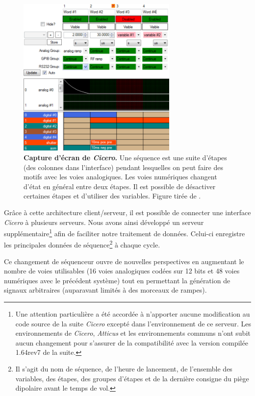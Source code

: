 \begin{figure}
\centering
\includegraphics[width=0.7\textwidth]{Fig/Modif_exp/cicero.png}
\caption{\textbf{Capture d'écran de \emph{Cicero}.} Une séquence est une suite d'étapes (des colonnes dans l'interface) pendant lesquelles on peut faire des motifs avec les voies analogiques. Les voies numériques changent d'état en général entre deux étapes. Il est possible de désactiver certaines étapes et d'utiliser des variables. Figure tirée de \citep{keshet2013distributed}.}
\label{fig:cicero}
\end{figure}

Grâce à cette architecture client/serveur, il est possible de connecter une interface \emph{Cicero} à plusieurs serveurs. Nous avons ainsi développé un serveur supplémentaire\footnote{Une attention particulière a été accordée à n'apporter aucune modification au code source de la suite \emph{Cicero} excepté dans l'environnement de ce serveur. Les environnements de \emph{Cicero}, \emph{Atticus} et les environnements communs n'ont subit aucun changement pour s'assurer de la compatibilité avec la version compilée 1.64rev7 de la suite.} afin de faciliter notre traitement de données. Celui-ci enregistre les principales données de séquence\footnote{Il s'agit du nom de séquence, de l'heure de lancement, de l'ensemble des variables, des étapes, des groupes d'étapes et de la dernière consigne du piège dipolaire avant le temps de vol.} à chaque cycle.

Ce changement de séquenceur ouvre de nouvelles perspectives en augmentant le nombre de voies utilisables (16 voies analogiques codées sur 12 bits et 48 voies numériques avec le précédent système) tout en permettant la génération de signaux arbitraires (auparavant limités à des morceaux de rampes).


